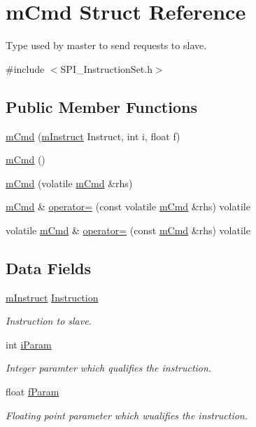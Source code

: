 \hypertarget{structm_cmd}{}\section{m\+Cmd Struct Reference}
\label{structm_cmd}


Type used by master to send requests to slave.  




{\ttfamily \#include $<$S\+P\+I\+\_\+\+Instruction\+Set.\+h$>$}

\subsection*{Public Member Functions}
\begin{DoxyCompactItemize}
\item 
\mbox{\hyperlink{structm_cmd_a15d47aa62e963ba62b9b5df21ff7c3b3}{m\+Cmd}} (\mbox{\hyperlink{_s_p_i___instruction_set_8h_afefab269eb3692ecb3e5fcdbb9440792}{m\+Instruct}} Instruct, int i, float f)
\item 
\mbox{\hyperlink{structm_cmd_a0bc6db1f094500a0605ce488869a1765}{m\+Cmd}} ()
\item 
\mbox{\hyperlink{structm_cmd_a390b853a14509e41006a0d873899b234}{m\+Cmd}} (volatile \mbox{\hyperlink{structm_cmd}{m\+Cmd}} \&rhs)
\item 
\mbox{\hyperlink{structm_cmd}{m\+Cmd}} \& \mbox{\hyperlink{structm_cmd_a861a79ec71e76fa61603073aa6969551}{operator=}} (const volatile \mbox{\hyperlink{structm_cmd}{m\+Cmd}} \&rhs) volatile
\item 
volatile \mbox{\hyperlink{structm_cmd}{m\+Cmd}} \& \mbox{\hyperlink{structm_cmd_a5a637df37056ccbe63f6fe600222c003}{operator=}} (const \mbox{\hyperlink{structm_cmd}{m\+Cmd}} \&rhs) volatile
\end{DoxyCompactItemize}
\subsection*{Data Fields}
\begin{DoxyCompactItemize}
\item 
\mbox{\hyperlink{_s_p_i___instruction_set_8h_afefab269eb3692ecb3e5fcdbb9440792}{m\+Instruct}} \mbox{\hyperlink{structm_cmd_a7adb91eb9d020c0f2650e99a857d2c3d}{Instruction}}
\begin{DoxyCompactList}\small\item\em Instruction to slave. \end{DoxyCompactList}\item 
int \mbox{\hyperlink{structm_cmd_a4d0a4aab326d0ba8eb8128adb61c0888}{i\+Param}}
\begin{DoxyCompactList}\small\item\em Integer paramter which qualifies the instruction. \end{DoxyCompactList}\item 
float \mbox{\hyperlink{structm_cmd_af05b89ac7edf2c67bb3386c902369313}{f\+Param}}
\begin{DoxyCompactList}\small\item\em Floating point parameter which wualifies the instruction. \end{DoxyCompactList}\end{DoxyCompactItemize}


